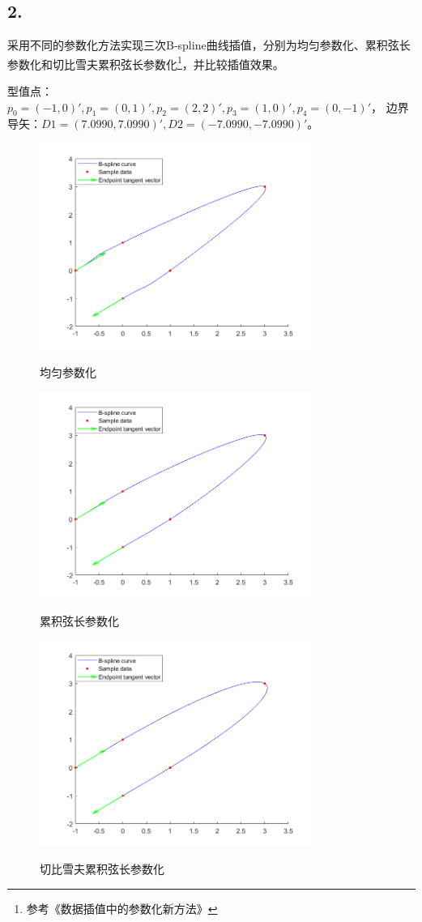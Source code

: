\documentclass[utf8]{ctexart}
\begin{document}
\subsection*{2.}
采用不同的参数化方法实现三次B-spline曲线插值，分别为均匀参数化、累积弦长参数化和切比雪夫累积弦长参数化\footnote{参考《数据插值中的参数化新方法》}，并比较插值效果。\par
型值点：$p_0=(-1,0)', p_1=(0,1)', p_2=(2,2)', p_3=(1,0)', p_4=(0,-1)'$，
边界导矢：$D1 = (7.0990, 7.0990)', D2=(-7.0990, -7.0990)'$。
\begin{figure}[H]
    \centering
    \includegraphics[width=0.8\textwidth]{cubic_bspline_interp_uniform.png}
    \label{fig: cubic_bspline_interp_uniform}
    \caption{均匀参数化}
\end{figure}
\begin{figure}[H]
    \centering
    \includegraphics[width=0.8\textwidth]{cubic_bspline_interp_chord.png}
    \label{fig: cubic_bspline_interp_chord}
    \caption{累积弦长参数化}
\end{figure}
\begin{figure}[H]
    \centering
    \includegraphics[width=0.8\textwidth]{cubic_bspline_interp_cheby.png}
    \label{fig: cubic_bspline_interp_cheby}
    \caption{切比雪夫累积弦长参数化}
\end{figure}
\end{document}
